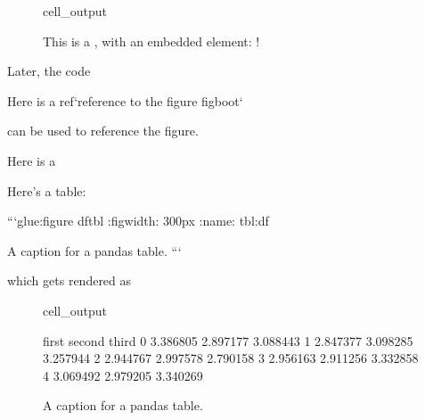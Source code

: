 \documentclass[letterpaper,10pt,english]{jupyterBook}
\begin{document}
\begin{figure}[htbp]
\centering
\capstart
\begin{sphinxVerbatimOutput}

\begin{sphinxuseclass}{cell_output}
\noindent{}

\end{sphinxuseclass}\end{sphinxVerbatimOutput}
\caption{This is a , with an embedded  element: !}\label{\detokenize{overview:fig-boot}}\end{figure}

\sphinxAtStartPar
Later, the code

\begin{sphinxVerbatim}[commandchars=\\\{\}]
Here is a \PYGZob{}ref\PYGZcb{}`reference to the figure \PYGZlt{}fig\PYGZhy{}boot\PYGZgt{}`
\end{sphinxVerbatim}

\sphinxAtStartPar
can be used to reference the figure.

\sphinxAtStartPar
Here is a {\hyperref[\detokenize{overview:fig-boot}]{}}

\sphinxAtStartPar
Here’s a table:

\begin{sphinxVerbatim}[commandchars=\\\{\}]
```\PYGZob{}glue:figure\PYGZcb{} df\PYGZus{}tbl
:figwidth: 300px
:name: \PYGZdq{}tbl:df\PYGZdq{}

A caption for a pandas table.
```
\end{sphinxVerbatim}

\sphinxAtStartPar
which gets rendered as

\begin{figure}[htbp]
\centering
\capstart
\begin{sphinxVerbatimOutput}

\begin{sphinxuseclass}{cell_output}
\begin{sphinxVerbatim}[commandchars=\\\{\}]
      first    second     third
0  3.386805  2.897177  3.088443
1  2.847377  3.098285  3.257944
2  2.944767  2.997578  2.790158
3  2.956163  2.911256  3.332858
4  3.069492  2.979205  3.340269
\end{sphinxVerbatim}

\end{sphinxuseclass}\end{sphinxVerbatimOutput}
\caption{A caption for a pandas table.}\label{\detokenize{overview:tbl-df}}\end{figure}
\end{document}
